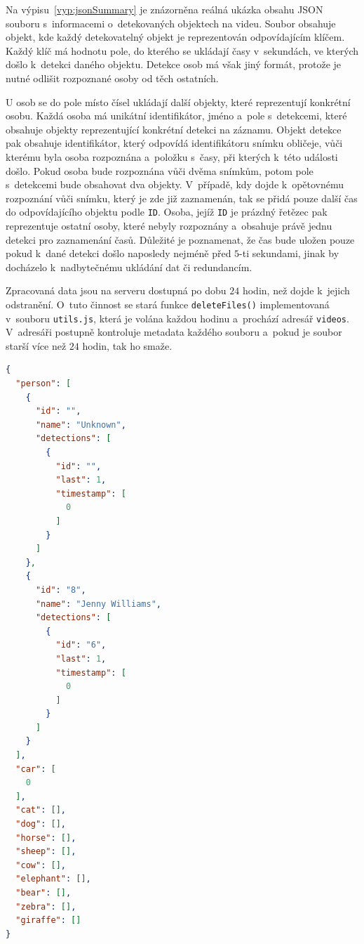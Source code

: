Na výpisu~\ref{vyp:jsonSummary} je znázorněna reálná ukázka obsahu JSON souboru s~informacemi o~detekovaných objektech na videu. Soubor obsahuje objekt, kde každý detekovatelný objekt je reprezentován odpovídajícím klíčem. Každý klíč má hodnotu pole, do kterého se ukládají časy v~sekundách, ve kterých došlo k~detekci daného objektu. Detekce osob má však jiný formát, protože je nutné odlišit rozpoznané osoby od těch ostatních.

U osob se do pole místo čísel ukládají další objekty, které reprezentují konkrétní osobu. Každá osoba má unikátní identifikátor, jméno a~pole s~detekcemi, které obsahuje objekty reprezentující konkrétní detekci na záznamu. Objekt detekce pak obsahuje identifikátor, který odpovídá identifikátoru snímku obličeje, vůči kterému byla osoba rozpoznána a~položku s~časy, při kterých k~této události došlo. Pokud osoba bude rozpoznána vůči dvěma snímkům, potom pole s~detekcemi bude obsahovat dva objekty. V~případě, kdy dojde k~opětovnému rozpoznání vůči snímku, který je zde již zaznamenán, tak se přidá pouze další čas do odpovídajícího objektu podle \texttt{ID}. Osoba, jejíž \texttt{ID} je prázdný řetězec pak reprezentuje ostatní osoby, které nebyly rozpoznány a~obsahuje právě jednu detekci pro zaznamenání časů. Důležité je poznamenat, že čas bude uložen pouze pokud k~dané detekci došlo naposledy nejméně před $5$-ti sekundami, jinak by docházelo k~nadbytečnému ukládání dat či redundancím.

Zpracovaná data jsou na serveru dostupná po dobu $24$ hodin, než dojde k~jejich odstranění. O~tuto činnost se stará funkce \texttt{deleteFiles()} implementovaná v~souboru \texttt{utils.js}, která je volána každou hodinu a~prochází adresář \texttt{videos}. V~adresáři postupně kontroluje metadata každého souboru a~pokud je soubor starší více než $24$ hodin, tak ho smaže.

\newpage
\begin{lstlisting}[language=json,firstnumber=1, label={vyp:jsonSummary}, caption={Ukázka obsahu JSON souboru s~informacemi o~detekovaných objektech ve videu.}]
{
  "person": [
    {
      "id": "",
      "name": "Unknown",
      "detections": [
        {
          "id": "",
          "last": 1,
          "timestamp": [
            0
          ]
        }
      ]
    },
    {
      "id": "8",
      "name": "Jenny Williams",
      "detections": [
        {
          "id": "6",
          "last": 1,
          "timestamp": [
            0
          ]
        }
      ]
    }
  ],
  "car": [
    0
  ],
  "cat": [],
  "dog": [],
  "horse": [],
  "sheep": [],
  "cow": [],
  "elephant": [],
  "bear": [],
  "zebra": [],
  "giraffe": []
}
\end{lstlisting}

